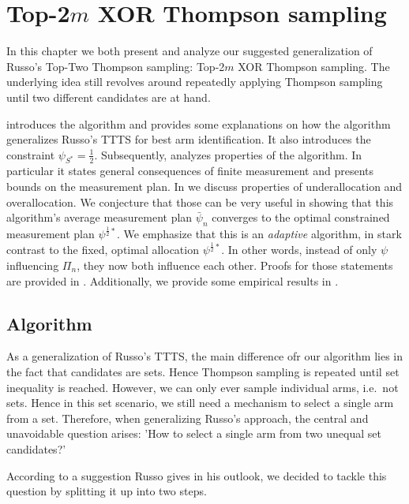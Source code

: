 \chapter{Top-2$m$ XOR Thompson sampling}\label{chapter:algorithm}

In this chapter we both present and analyze our suggested generalization of
Russo's Top-Two Thompson sampling: Top-2$m$ XOR Thompson sampling. The
underlying idea still revolves around repeatedly applying Thompson sampling
until two different candidates are at hand.

 introduces the algorithm and provides some explanations
on how the algorithm generalizes Russo's TTTS for best arm identification. It
also introduces the constraint $\psi_{S^*} = \frac{1}{2}$. Subsequently,
 analyzes properties of the algorithm. In particular it
states general consequences of finite measurement and presents bounds on the
measurement plan. In  we discuss properties of
underallocation and overallocation. We conjecture that those can be very useful
in showing that this algorithm's average measurement plan $\bar{\psi}_n$
converges to the optimal constrained measurement plan $\psi^{\frac{1}{2}*}$. We
emphasize that this is an \emph{adaptive} algorithm, in stark contrast to the
fixed, optimal allocation $\psi^{\frac{1}{2}*}$. In other words, instead of only
$\psi$ influencing $\Pi_n$, they now both influence each other. Proofs for those
statements are provided in . Additionally, we provide
some empirical results in .

\section{Algorithm}\label{section:algorithm}
As a generalization of Russo's TTTS, the main difference ofr our algorithm lies
in the fact that candidates are sets. Hence Thompson sampling is repeated until
set inequality is reached. However, we can only ever sample individual arms,
i.e.\ not sets. Hence in this set scenario, we still need a mechanism to select
a single arm from a set. Therefore, when generalizing Russo's approach, the
central and unavoidable question arises: 'How to select a single arm from two
unequal set candidates?'

According to a suggestion Russo gives in his outlook, we decided to tackle this
question by splitting it up into two steps.

